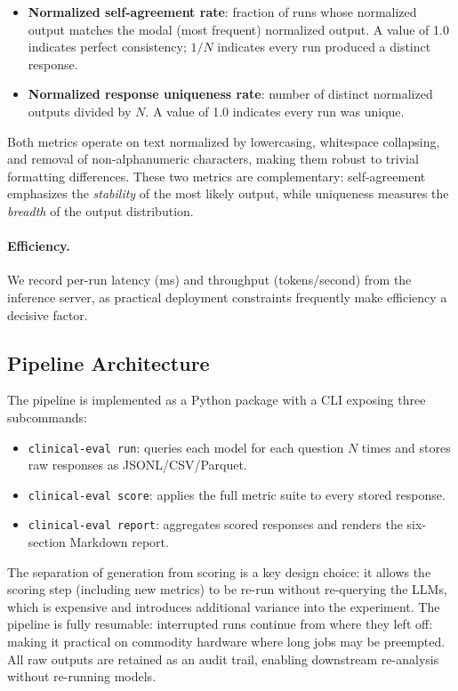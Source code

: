 \documentclass[11pt]{article}
\begin{document}
\begin{itemize}
  \item \textbf{Normalized self-agreement rate}: fraction of runs
        whose normalized output matches the modal (most frequent)
        normalized output.
        A value of 1.0 indicates perfect consistency; $1/N$ indicates
        every run produced a distinct response.
  \item \textbf{Normalized response uniqueness rate}: number of
        distinct normalized outputs divided by $N$.
        A value of 1.0 indicates every run was unique.
\end{itemize}

Both metrics operate on text normalized by lowercasing,
whitespace collapsing, and removal of non-alphanumeric characters,
making them robust to trivial formatting differences.
These two metrics are complementary: self-agreement emphasizes
the \emph{stability} of the most likely output, while uniqueness
measures the \emph{breadth} of the output distribution.

\paragraph{Efficiency.}
We record per-run latency (ms) and throughput (tokens/second)
from the inference server, as practical deployment constraints
frequently make efficiency a decisive factor.

\subsection{Pipeline Architecture}

The pipeline is implemented as a Python package with a CLI exposing
three subcommands:

\begin{itemize}
  \item \texttt{clinical-eval run}: queries each model for each
        question $N$ times and stores raw responses as
        JSONL/CSV/Parquet.
  \item \texttt{clinical-eval score}: applies the full metric
        suite to every stored response.
  \item \texttt{clinical-eval report}: aggregates scored
        responses and renders the six-section Markdown report.
\end{itemize}

The separation of generation from scoring is a key design choice:
it allows the scoring step (including new metrics) to be re-run
without re-querying the LLMs, which is expensive and introduces
additional variance into the experiment.
The pipeline is fully resumable: interrupted runs continue from
where they left off: making it practical on commodity hardware
where long jobs may be preempted.
All raw outputs are retained as an audit trail, enabling downstream
re-analysis without re-running models.
\end{document}
